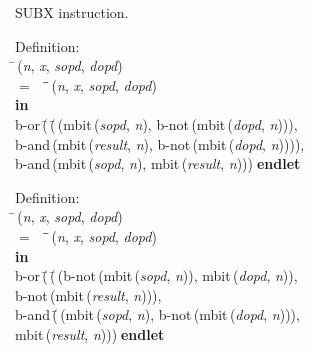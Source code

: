  SUBX instruction.
\begin{tabbing}{\sc Definition}: \\  
\=\,({\it{n\/}}, {\it{x\/}}, {\it{sopd\/}}, {\it{dopd\/}}) \\ 
$=$$\;\;\;\;$\=\=\,({\it{n\/}}, {\it{x\/}}, {\it{sopd\/}}, {\it{dopd\/}})\- \\ 
{\bf in} \\ 
{\rm{b-or}}\,(\=\,(\=\,({\rm{mbit}}\,({\it{sopd\/}}, {\it{n\/}}), {\rm{b-not}}\,({\rm{mbit}}\,({\it{dopd\/}}, {\it{n\/}}))), \\ 
{\rm{b-and}}\,({\rm{mbit}}\,({\it{result\/}}, {\it{n\/}}), {\rm{b-not}}\,({\rm{mbit}}\,({\it{dopd\/}}, {\it{n\/}}))))\-, \\ 
{\rm{b-and}}\,({\rm{mbit}}\,({\it{sopd\/}}, {\it{n\/}}), {\rm{mbit}}\,({\it{result\/}}, {\it{n\/}})))\-$\;${\bf  endlet}\-\-
\end{tabbing}

\begin{tabbing}{\sc Definition}: \\  
\=\,({\it{n\/}}, {\it{x\/}}, {\it{sopd\/}}, {\it{dopd\/}}) \\ 
$=$$\;\;\;\;$\=\=\,({\it{n\/}}, {\it{x\/}}, {\it{sopd\/}}, {\it{dopd\/}})\- \\ 
{\bf in} \\ 
{\rm{b-or}}\,(\=\,(\=\,({\rm{b-not}}\,({\rm{mbit}}\,({\it{sopd\/}}, {\it{n\/}})), {\rm{mbit}}\,({\it{dopd\/}}, {\it{n\/}})), \\ 
{\rm{b-not}}\,({\rm{mbit}}\,({\it{result\/}}, {\it{n\/}})))\-, \\ 
{\rm{b-and}}\,(\=\,({\rm{mbit}}\,({\it{sopd\/}}, {\it{n\/}}), {\rm{b-not}}\,({\rm{mbit}}\,({\it{dopd\/}}, {\it{n\/}}))), \\ 
{\rm{mbit}}\,({\it{result\/}}, {\it{n\/}}))\-)\-$\;${\bf  endlet}\-\-
\end{tabbing}

